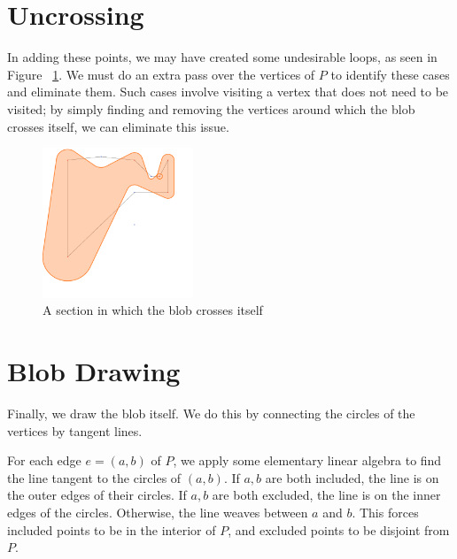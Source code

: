 \documentclass[paper=a4, fontsize=11pt]{scrartcl} %
\numberwithin{equation}{section} %
\numberwithin{figure}{section} %
\numberwithin{table}{section} %
\begin{document}
\section{Uncrossing}

In adding these points, we may have created some undesirable loops, as seen in
Figure ~\ref{fig:loop}. We must do an extra pass over the vertices of $P$ to
identify these cases and eliminate them. Such cases involve visiting a vertex
that does not need to be visited; by simply finding and removing the vertices
around which the blob crosses itself, we can eliminate this issue.

\begin{figure}[h]
\includegraphics[width=0.4\textwidth]{loop}
\centering
\caption{A section in which the blob crosses itself}
\label{fig:loop}
\end{figure}

\section{Blob Drawing}
Finally, we draw the blob itself. We do this by connecting the circles of the
vertices by tangent lines.

For each edge $e=(a,b)$ of $P$, we apply some elementary linear algebra to find
the line tangent to the circles of $(a,b)$. If $a,b$ are both included, the line
is on the outer edges of their circles. If $a,b$ are both excluded, the line is
on the inner edges of the circles. Otherwise, the line weaves between $a$ and
$b$. This forces included points to be in the interior of $P$, and excluded
points to be disjoint from $P$.
\end{document}
